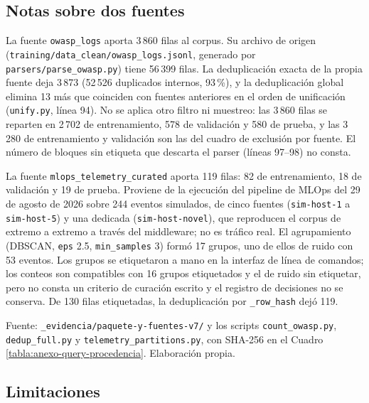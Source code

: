 \subsection{Notas sobre dos fuentes}\label{anexo:loso-fuentes}

\begingroup\sloppy
La fuente \texttt{owasp\_logs} aporta 3\,860 filas al corpus. Su archivo de origen (\texttt{training/\allowbreak data\_clean/\allowbreak owasp\_logs.jsonl}, generado por \texttt{parsers/\allowbreak parse\_owasp.py}) tiene 56\,399 filas. La deduplicación exacta de la propia fuente deja 3\,873 (52\,526 duplicados internos, 93\,\%), y la deduplicación global elimina 13 más que coinciden con fuentes anteriores en el orden de unificación (\texttt{unify.py}, línea 94). No se aplica otro filtro ni muestreo: las 3\,860 filas se reparten en 2\,702 de entrenamiento, 578 de validación y 580 de prueba, y las 3\,280 de entrenamiento y validación son las del cuadro de exclusión por fuente. El número de bloques sin etiqueta que descarta el parser (líneas 97--98) no consta.

La fuente \texttt{mlops\_\allowbreak telemetry\_\allowbreak curated} aporta 119 filas: 82 de entrenamiento, 18 de validación y 19 de prueba. Proviene de la ejecución del pipeline de MLOps del 29 de agosto de 2026 sobre 244 eventos simulados, de cinco fuentes (\texttt{sim-host-1} a \texttt{sim-host-5}) y una dedicada (\texttt{sim-host-novel}), que reproducen el corpus de extremo a extremo a través del middleware; no es tráfico real. El agrupamiento (DBSCAN, \texttt{eps} 2.5, \texttt{min\_\allowbreak samples} 3) formó 17 grupos, uno de ellos de ruido con 53 eventos. Los grupos se etiquetaron a mano en la interfaz de línea de comandos; los conteos son compatibles con 16 grupos etiquetados y el de ruido sin etiquetar, pero no consta un criterio de curación escrito y el registro de decisiones no se conserva. De 130 filas etiquetadas, la deduplicación por \texttt{\_row\_\allowbreak hash} dejó 119.

{\sloppy Fuente: \texttt{\_evidencia/\allowbreak paquete-y-fuentes-v7/} y los scripts \texttt{count\_\allowbreak owasp.py}, \texttt{dedup\_\allowbreak full.py} y \texttt{telemetry\_\allowbreak partitions.py}, con SHA-256 en el Cuadro \ref{tabla:anexo-query-procedencia}. Elaboración propia.\par}
\endgroup

\subsection{Limitaciones}\label{anexo:loso-limitaciones}

